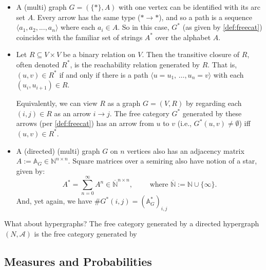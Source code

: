 \begin{itemize}
    \item 
A (multi) graph $G = (\{\ast\}, A)$ with one vertex can be identified with its arc set $A$. Every arrow has the same type ($\ast \to \ast$), and so a path is a sequence 
$\langle a_1, a_2, ..., a_n\rangle$
where each $a_i \in A$. 
So in this case, $G^*$ (as given by \cref{def:freecat}) coincides
with the familiar set of strings $A^*$ over the alphabet $A$.

    \item
Let $R \subseteq V \times V$ be a binary relation on $V$.
Then the transitive closure of $R$, often denoted $R^*$,
    is the reachability relation generated by $R$. 
That is, $(u,v) \in R^*$ if and only if there is a path $\langle u{=}u_1,\, \ldots, u_n{=}v\rangle$ with each $(u_i, u_{i+1}) \in R$.

Equivalently, we can view $R$ as a graph $G = (V,R)$ by regarding each $(i,j) \in R$ as an arrow $i \to j$. The free category $G^*$ generated by these arrows (per \cref{def:freecat}) has an arrow from $u$ to $v$ (i.e., $G^*(u,v) \ne \emptyset$) iff $(u,v) \in R^*$.

\item 
A (directed) (multi) graph $G$ on $n$ vertices also has an adjacency matrix 
$A := \mathbb A_G \in \mathbb N^{n\times n}$.  Square matrices over a semiring
also have notion of a star, given by:
\[
    A^* = \sum_{n=0}^\infty A^n  \in \overline{\mathbb N}^{n\times n},
    \qquad \text{ where } \overline{\mathbb N} := \mathbb N \cup \{\infty\}.
\]
And, yet again, we have $\#G^*(i,j) = (\mathbb A_G^*)_{i,j}$
\end{itemize}


What about hypergraphs?
The free category generated by a directed hypergraph
$(N, \mathcal A)$
is the free category generated by 


\begin{defn}
    
\end{defn}


\subsection{Measures and Probabilities}

